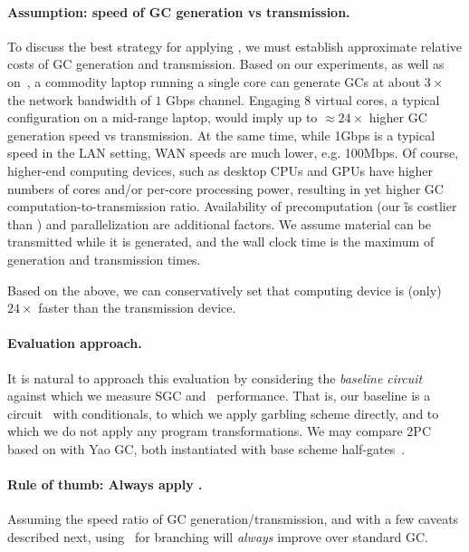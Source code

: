 \paragraph{Assumption: speed of GC generation vs transmission.}  To discuss the best strategy for applying \ourscheme, we must establish approximate relative costs of GC generation and transmission.  Based on our experiments, as well as on~\cite{XiaoPersonalComm}, a commodity laptop running a single core can generate GCs at about $3\times$ the network bandwidth of $1$ Gbps channel.  Engaging  $8$ virtual cores, a typical configuration on a mid-range laptop, would imply up to $\approx 24\times$ higher GC generation speed vs transmission.   At the same time, while 1Gbps is a typical speed in the LAN setting, WAN speeds are much lower, e.g. 100Mbps.  Of course, higher-end computing devices, such as desktop CPUs and GPUs have higher numbers of cores and/or per-core processing power, resulting in yet higher GC computation-to-transmission ratio.  Availability of precomputation (our \G is costlier than \E) and parallelization are additional factors.  
We assume 
material can be transmitted while it is generated, and the wall clock time is the maximum of generation and transmission times.

Based on the above, we can conservatively set that computing device is (only) $24\times$ faster than the transmission device.




\paragraph{Evaluation approach.}  It is natural to approach this evaluation by considering the {\em baseline circuit} against which we measure SGC and \ourscheme\ performance.    That is, our baseline is a circuit \cir\ with conditionals, to which we apply garbling scheme directly, and to which we do not apply any program transformations.  We may compare 2PC based on \ourscheme with  Yao GC, both instantiated with base scheme half-gates~\cite{EC:ZahRosEva15}.



\paragraph{Rule of thumb: Always apply \ourscheme.}  Assuming the speed ratio of GC generation/transmission, and with a few caveats described next, using \ourscheme\ for branching will {\em always} improve over standard GC. 

